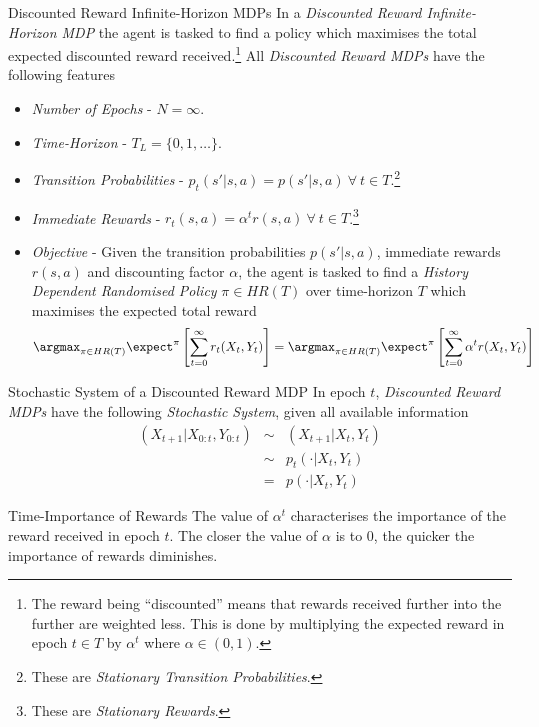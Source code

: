 \documentclass[11pt,a4paper]{article}
\begin{document}
  \begin{definition}{Discounted Reward Infinite-Horizon MDPs}
    In a \textit{Discounted Reward Infinite-Horizon MDP} the agent is tasked to find a policy which maximises the total expected discounted reward received.\footnote{The reward being ``discounted'' means that rewards received further into the further are weighted less. This is done by multiplying the expected reward in epoch $t\in T$ by $\alpha^t$ where $\alpha\in(0,1)$.}
    All \textit{Discounted Reward MDPs} have the following features
    \begin{itemize}
      \item \textit{Number of Epochs} - $N=\infty$.
      \item \textit{Time-Horizon} - $T_L=\{0,1,\dots\}$.
      \item \textit{Transition Probabilities} - $p_t(s'|s,a)=p(s'|s,a)\ \forall\ t\in T$.\footnote{These are \textit{Stationary Transition Probabilities}.}
      \item \textit{Immediate Rewards} - $r_t(s,a)=\alpha^tr(s,a)\ \forall\ t\in T$.\footnote{These are \textit{Stationary Rewards}.}
      \item \textit{Objective} - Given the transition probabilities $p(s'|s,a)$, immediate rewards $r(s,a)$ and discounting factor $\alpha$, the agent is tasked to find a \textit{History Dependent Randomised Policy} $\pi\in HR(T)$ over time-horizon $T$ which maximises the expected total reward
      \[ \argmax_{\pi\in HR(T)}\expect^\pi\left[\sum_{t=0}^\infty r_t(X_t,Y_t)\right]=\argmax_{\pi\in HR(T)}\expect^\pi\left[\sum_{t=0}^\infty \alpha^tr(X_t,Y_t)\right] \]
    \end{itemize}
  \end{definition}

  \begin{proposition}{Stochastic System of a Discounted Reward MDP}
    In epoch $t$, \textit{Discounted Reward MDPs} have the following \textit{Stochastic System}, given all available information
    \[\begin{array}{rcl}
      (X_{t+1}|X_{0:t},Y_{0:t})&\sim&(X_{t+1}|X_t,Y_t)\\
      &\sim&p_t(\cdot|X_t,Y_t)\\
      &=&p(\cdot|X_t,Y_t)
    \end{array}\]
  \end{proposition}

  \begin{remark}{Time-Importance of Rewards}
    The value of $\alpha^t$ characterises the importance of the reward received in epoch $t$. The closer the value of $\alpha$ is to 0, the quicker the importance of rewards diminishes.
  \end{remark}
\end{document}
